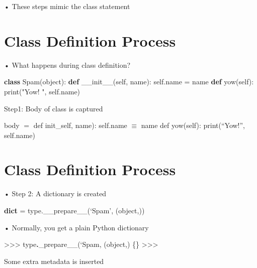 \documentclass[
  letterpaper,
  DIV=11,
  numbers=noendperiod]{scrreprt}
\newenvironment{Shaded}{\begin{snugshade}}{\end{snugshade}}
\newcommand{\BuiltInTok}[1]{\textcolor[rgb]{0.00,0.23,0.31}{#1}}
\newcommand{\DataTypeTok}[1]{\textcolor[rgb]{0.68,0.00,0.00}{#1}}
\newcommand{\ErrorTok}[1]{\textcolor[rgb]{0.68,0.00,0.00}{#1}}
\newcommand{\FunctionTok}[1]{\textcolor[rgb]{0.28,0.35,0.67}{#1}}
\newcommand{\KeywordTok}[1]{\textcolor[rgb]{0.00,0.23,0.31}{\textbf{#1}}}
\newcommand{\NormalTok}[1]{\textcolor[rgb]{0.00,0.23,0.31}{#1}}
\newcommand{\OperatorTok}[1]{\textcolor[rgb]{0.37,0.37,0.37}{#1}}
\newcommand{\StringTok}[1]{\textcolor[rgb]{0.13,0.47,0.30}{#1}}
\newcommand{\VariableTok}[1]{\textcolor[rgb]{0.07,0.07,0.07}{#1}}
\begin{document}
• These steps mimic the class statement


\chapter{Class Definition Process}\label{class-definition-process}

• What happens during class definition?

\begin{Shaded}
\begin{Highlighting}[]
\KeywordTok{class}\NormalTok{ Spam(}\BuiltInTok{object}\NormalTok{): }\KeywordTok{def} \FunctionTok{\_\_init\_\_}\NormalTok{(}\VariableTok{self}\NormalTok{, name): }\VariableTok{self}\NormalTok{.name }\OperatorTok{=}\NormalTok{ name }\KeywordTok{def}\NormalTok{ yow(}\VariableTok{self}\NormalTok{): }\BuiltInTok{print}\NormalTok{(}\StringTok{"Yow! "}\NormalTok{, }\VariableTok{self}\NormalTok{.name) }
\end{Highlighting}
\end{Shaded}

Step1: Body of class is captured

body \(=\) def init\_self, name): self.name \(\equiv\) name def
yow(self): print(``Yow!'', self.name)


\chapter{Class Definition Process}\label{class-definition-process-1}

• Step 2: A dictionary is created

\textbf{dict} = type.\_\_prepare\_\_(`Spam', (object,))

• Normally, you get a plain Python dictionary

\begin{Shaded}
\begin{Highlighting}[]
\NormalTok{\textgreater{}\textgreater{}\textgreater{} type}\KeywordTok{.}\DataTypeTok{\_prepare\_\_}\NormalTok{(}\ErrorTok{‘}\DataTypeTok{Spam}\StringTok{\textquotesingle{}}\ErrorTok{, (object,)  }
\ErrorTok{\{\}  }
\ErrorTok{\textgreater{}\textgreater{}\textgreater{} }
\end{Highlighting}
\end{Shaded}

Some extra metadata is inserted
\end{document}
